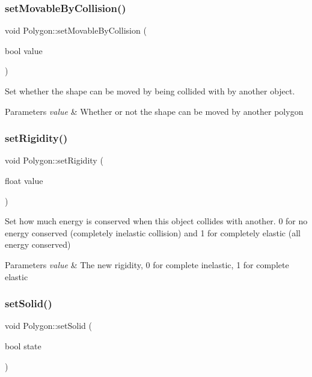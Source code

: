 \subsubsection{\texorpdfstring{setMovableByCollision()}{setMovableByCollision()}}
{\footnotesize\ttfamily void Polygon\+::set\+Movable\+By\+Collision (\begin{DoxyParamCaption}\item[{bool}]{value }\end{DoxyParamCaption})}



Set whether the shape can be moved by being collided with by another object. 


\begin{DoxyParams}{Parameters}
{\em value} & Whether or not the shape can be moved by another polygon \\
\hline
\end{DoxyParams}
\mbox{\label{class_polygon_a5325135466047ff1a8bb215905c54c83}} 
\subsubsection{\texorpdfstring{setRigidity()}{setRigidity()}}
{\footnotesize\ttfamily void Polygon\+::set\+Rigidity (\begin{DoxyParamCaption}\item[{float}]{value }\end{DoxyParamCaption})}



Set how much energy is conserved when this object collides with another. 0 for no energy conserved (completely inelastic collision) and 1 for completely elastic (all energy conserved) 


\begin{DoxyParams}{Parameters}
{\em value} & The new rigidity, 0 for complete inelastic, 1 for complete elastic \\
\hline
\end{DoxyParams}
\mbox{\label{class_polygon_a0fc684c823f560d066bc8fdfe10fd8f0}} 
\subsubsection{\texorpdfstring{setSolid()}{setSolid()}}
{\footnotesize\ttfamily void Polygon\+::set\+Solid (\begin{DoxyParamCaption}\item[{bool}]{state }\end{DoxyParamCaption})}




